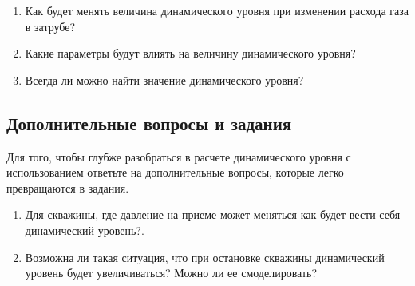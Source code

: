 \begin{enumerate}
	
	\item Как будет менять величина динамического уровня при изменении расхода газа в затрубе?
	\item Какие параметры будут влиять на величину динамического уровня?
	\item Всегда ли можно найти значение динамического уровня?
	
	
\end{enumerate}

\subsection{Дополнительные вопросы и задания}

Для того, чтобы глубже разобраться в расчете динамического уровня с использованием \unf{} ответьте на дополнительные вопросы, которые легко превращаются в задания.

\begin{enumerate}
	
	\item Для скважины, где давление на приеме может меняться как будет вести себя динамический уровень?.
	\item Возможна ли такая ситуация, что при остановке скважины динамический уровень будет увеличиваться? Можно ли ее смоделировать?
	
\end{enumerate}

